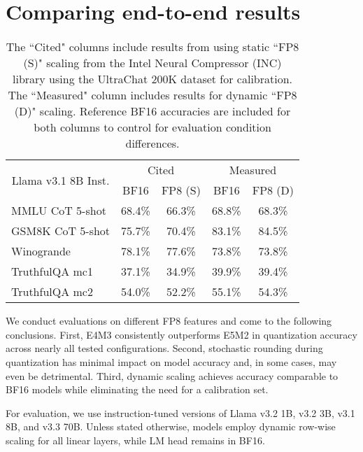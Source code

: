 \section{Comparing end-to-end results}\label{sec:end2end}

\begin{table}
\centering
\caption{The ``Cited" columns include results from \citet{sqzb_fp8_blog} using static ``FP8 (S)" scaling from the Intel Neural Compressor (INC) library using the UltraChat 200K \citep{ultrachat_200k} dataset for calibration. The ``Measured" column includes results for dynamic ``FP8 (D)" scaling. Reference BF16 accuracies are included for both columns to control for evaluation condition differences.}
\vskip 0.15in
\small
\begin{tabular}{@{}lcccc@{}}
\toprule
\multicolumn{1}{c}{\multirow{2}{*}{Llama v3.1 8B Inst.}} & \multicolumn{2}{c}{Cited} & \multicolumn{2}{c}{Measured} \\ \cmidrule(l){2-5} 
\multicolumn{1}{c}{}                      & BF16     & FP8 (S)     & BF16      & FP8 (D)      \\ \midrule
MMLU CoT 5-shot  & 68.4\% & 66.3\% & 68.8\% & 68.3\% \\
GSM8K CoT 5-shot & 75.7\% & 70.4\% & 83.1\% & 84.5\% \\
Winogrande       & 78.1\% & 77.6\% & 73.8\% & 73.8\% \\
TruthfulQA mc1   & 37.1\% & 34.9\% & 39.9\% & 39.4\% \\
TruthfulQA mc2   & 54.0\% & 52.2\% & 55.1\% & 54.3\% \\ \bottomrule
\end{tabular}
\vskip -0.1in
\label{tab:static_vs_dynamic}
\end{table}

We conduct evaluations on different FP8 features and come to the following conclusions. First, E4M3 consistently outperforms E5M2 in quantization accuracy across nearly all tested configurations.
Second, stochastic rounding during quantization has minimal impact on model accuracy and, in some cases, may even be detrimental.
Third, dynamic scaling achieves accuracy comparable to BF16 models while eliminating the need for a calibration set.

For evaluation, we use instruction-tuned versions of Llama v3.2 1B, v3.2 3B, v3.1 8B, and v3.3 70B. Unless stated otherwise, models employ dynamic row-wise scaling for all linear layers, while LM head remains in BF16.




